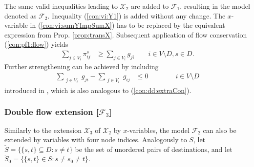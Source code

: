 The same valid inequalities  leading to $\mathcal{X}_2$ are added to $\mathcal{F}_1$, resulting in the model denoted as $\mathcal{F}_2$.
Inequality (\ref{con:vi:Y1}) is added without any change.
The $x$-variable in (\ref{con:vi:sumYImpSumX}) has to be replaced by the equivalent expression from Prop. \ref{prop:transX}. 
Subsequent application of flow conservation (\ref{con:pf1:flow}) yields
\begin{subequations}[resume]
\begin{flalign}
\label{con:vi:sumYImpSumXTrans} \sum\limits_{j\in V_i }\pi^{s}_{ij} & \geq \sum\limits_{j\in V_i}  g_{ji}  \quad\quad   i\in V\setminus D, s\in D. 
\end{flalign}
\end{subequations}
%
Further strengthening can be achieved by including 
\begin{subequations}[resume]
\begin{flalign}
\label{con:pf1:flowX}  \sum\limits_{\substack{ j\in V_i }}g_{ji}-\sum\limits_{\substack{j\in V_i}}g_{ij}    & \leq 0    \qquad\qquad			  i\in V\setminus D 
\end{flalign}
\end{subequations}
introduced in \cite{Polzin}, which is also analogous to (\ref{con:dd:extraCon}).

\subsubsection{Double flow extension [$\mathcal{F}_3$]}

Similarly to the extension $\mathcal{X}_3$ of $\mathcal{X}_2$ by $x$-variables, the model $\mathcal{F}_2$ can also be extended by variables with four node indices.
Analogously to $S$, let $\check{S}=\{\{s,t\}\subseteq D: s\neq t\}$ be the set of unordered pairs of destinations, and let $\check{S}_0=\{\{s,t\}\in S: s\neq s_0\neq t\}$.
 
